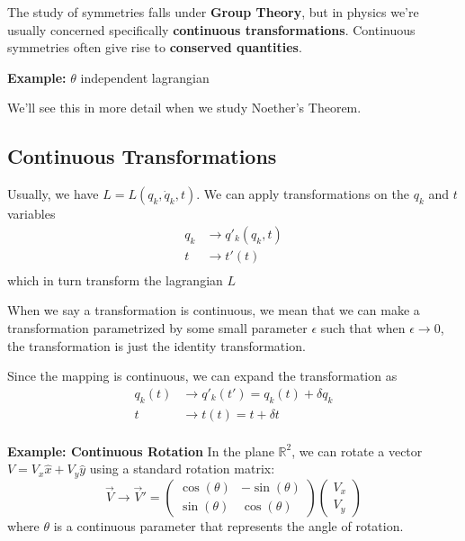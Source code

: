 \documentclass[11pt]{article}
\begin{document}
\vskip 0.5cm
The study of symmetries falls under \textbf{Group Theory}, but in physics we're usually concerned specifically \textbf{continuous transformations}. Continuous symmetries often give rise to \textbf{conserved quantities}.

\begin{redbox}
  \textbf{Example:} $\theta$ independent lagrangian
\end{redbox}

We'll see this in more detail when we study Noether's Theorem.

\vskip 0.5cm
\subsection{Continuous Transformations}
Usually, we have $L = L\left(q_{k}, \dot{q}_{k}, t\right)$. We can apply transformations on the $q_{k}$ and $t$ variables
\begin{align*}
  q_{k} &\rightarrow q'_{k}(q_{k}, t) \\
  t &\rightarrow t'(t) \\
\end{align*}
which in turn transform the lagrangian $L$

\vskip 0.5cm
When we say a transformation is continuous, we mean that we can make a transformation parametrized by some small parameter $\epsilon$ such that when $\epsilon \rightarrow 0$, the transformation is just the identity transformation.

\vskip 0.5cm
Since the mapping is continuous, we can expand the transformation as 
\begin{align*}
  q_{k}(t) &\rightarrow q'_k(t') = q_{k}(t) + \delta q_{k} \\
  t &\rightarrow t(t) = t + \delta t \\
\end{align*}

\begin{redbox}
  \textbf{Example: Continuous Rotation}
  In the plane $\mathbb{R}^2$, we can rotate a vector $V = V_x \hat{x} + V_y \hat{y}$ using a standard rotation matrix:
  \[ \vec{V} \rightarrow \vec{V}' = \begin{pmatrix}
    \cos(\theta) & -\sin(\theta) \\
    \sin(\theta) & \cos(\theta) 
  \end{pmatrix} \begin{pmatrix}
    V_x \\
    V_y
  \end{pmatrix} \]
  where $\theta$ is a continuous parameter that represents the angle of rotation.
\end{redbox}
\end{document}
